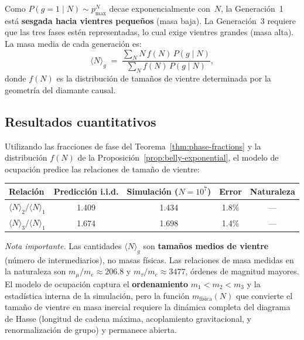 \documentclass[11pt, a4paper, openany]{book}
\begin{document}
Como $P(g=1 \mid N) \sim p_{\max}^N$ decae exponencialmente con~$N$,
la Generaci\'on~1 est\'a \textbf{sesgada hacia vientres peque\~nos}
(masa baja). La Generaci\'on~3 requiere que las tres fases est\'en
representadas, lo cual exige vientres grandes (masa alta). La masa
media de cada generaci\'on es:
\begin{equation}
  \langle N \rangle_g \;=\; \frac{\sum_N N\,f(N)\,P(g \mid N)}
                                  {\sum_N f(N)\,P(g \mid N)},
  \label{eq:mass-occupancy}
\end{equation}
donde $f(N)$ es la distribuci\'on de tama\~nos de vientre determinada
por la geometr\'ia del diamante causal.

\subsection{Resultados cuantitativos}

Utilizando las fracciones de fase del
Teorema~\ref{thm:phase-fractions} y la distribuci\'on $f(N)$ de la
Proposici\'on~\ref{prop:belly-exponential}, el modelo de ocupaci\'on
predice las relaciones de tama\~no de vientre:

\medskip
\begin{center}
\small
\begin{tabular}{lcccc}
\toprule
\textbf{Relaci\'on} & \textbf{Predicci\'on i.i.d.}
  & \textbf{Simulaci\'on ($N\!=\!10^7$)}
  & \textbf{Error} & \textbf{Naturaleza} \\
\midrule
$\langle N\rangle_2 / \langle N\rangle_1$
  & 1{.}409 & 1{.}434 & 1{.}8\% & --- \\
$\langle N\rangle_3 / \langle N\rangle_1$
  & 1{.}674 & 1{.}698 & 1{.}4\% & --- \\
\bottomrule
\end{tabular}
\end{center}
\medskip

\noindent\textit{Nota importante.}\enspace
Las cantidades $\langle N\rangle_g$ son \textbf{tama\~nos medios de
vientre} (n\'umero de intermediarios), no masas f\'isicas. Las
relaciones de masa medidas en la naturaleza son
$m_\mu / m_e \approx 206{.}8$ y $m_\tau / m_e \approx 3477$,
\'ordenes de magnitud mayores. El modelo de ocupaci\'on captura el
\textbf{ordenamiento} $m_1 < m_2 < m_3$ y la estad\'istica interna
de la simulaci\'on, pero la funci\'on $m_{\text{f\'isica}}(N)$ que
convierte el tama\~no de vientre en masa inercial requiere la
din\'amica completa del diagrama de Hasse (longitud de cadena m\'axima,
acoplamiento gravitacional, y renormalizaci\'on de grupo) y permanece
abierta.
\end{document}
